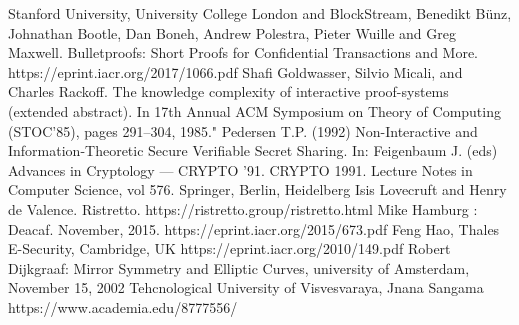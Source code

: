 \documentclass{article}
\begin{document}
\begin{thebibliography}{99}

 Stanford University, University College London and BlockStream, Benedikt Bünz, Johnathan Bootle, Dan Boneh, Andrew Polestra, Pieter Wuille and Greg Maxwell. Bulletproofs: Short Proofs for Confidential Transactions and More.\\ https://eprint.iacr.org/2017/1066.pdf
 Shafi Goldwasser, Silvio Micali, and Charles Rackoff. The knowledge complexity of interactive
proof-systems (extended abstract). In 17th Annual ACM Symposium on Theory of Computing
(STOC’85), pages 291–304, 1985."
 Pedersen T.P. (1992) Non-Interactive and Information-Theoretic Secure Verifiable Secret Sharing. In: Feigenbaum J. (eds) Advances in Cryptology — CRYPTO ’91. CRYPTO 1991. Lecture Notes in Computer Science, vol 576. Springer, Berlin, Heidelberg
 Isis Lovecruft and Henry de Valence. Ristretto. https://ristretto.group/ristretto.html
 Mike Hamburg : Deacaf. November, 2015. https://eprint.iacr.org/2015/673.pdf
 Feng Hao, Thales E-Security, Cambridge, UK https://eprint.iacr.org/2010/149.pdf
Robert Dijkgraaf: Mirror Symmetry and Elliptic Curves, university of Amsterdam, November 15, 2002
 Tehcnological University of Visvesvaraya, Jnana Sangama https://www.academia.edu/8777556/

\end{thebibliography}
\end{document}
